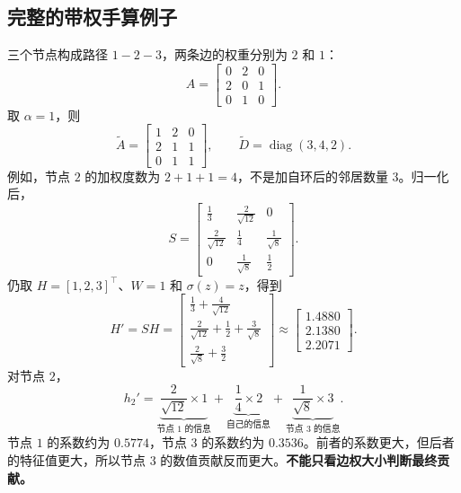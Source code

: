 \documentclass[UTF8,a4paper,11pt,fontset=fandol]{ctexart}
\begin{document}
\subsection{完整的带权手算例子}
三个节点构成路径 $1-2-3$，两条边的权重分别为 $2$ 和 $1$：
\begin{equation}
A=\begin{bmatrix}0&2&0\\2&0&1\\0&1&0\end{bmatrix}.
\end{equation}
取 $\alpha=1$，则
\begin{equation}
\widetilde A=\begin{bmatrix}1&2&0\\2&1&1\\0&1&1\end{bmatrix},
\qquad \widetilde D=\operatorname{diag}(3,4,2).
\end{equation}
例如，节点 $2$ 的加权度数为 $2+1+1=4$，不是加自环后的邻居数量 $3$。归一化后，
\begin{equation}
S=\begin{bmatrix}
\frac13&\frac2{\sqrt{12}}&0\\[2pt]
\frac2{\sqrt{12}}&\frac14&\frac1{\sqrt8}\\[2pt]
0&\frac1{\sqrt8}&\frac12
\end{bmatrix}.
\end{equation}
仍取 $H=[1,2,3]^\top$、$W=1$ 和 $\sigma(z)=z$，得到
\begin{equation}
H'=SH=
\begin{bmatrix}
\frac13+\frac4{\sqrt{12}}\\[3pt]
\frac2{\sqrt{12}}+\frac12+\frac3{\sqrt8}\\[3pt]
\frac2{\sqrt8}+\frac32
\end{bmatrix}
\approx\begin{bmatrix}1.4880\\2.1380\\2.2071\end{bmatrix}.
\end{equation}
对节点 $2$，
\begin{equation}
h_2'=
\underbrace{\frac2{\sqrt{12}}\times1}_{\text{节点 1 的信息}}
+\underbrace{\frac14\times2}_{\text{自己的信息}}
+\underbrace{\frac1{\sqrt8}\times3}_{\text{节点 3 的信息}}.
\end{equation}
节点 $1$ 的系数约为 $0.5774$，节点 $3$ 的系数约为 $0.3536$。前者的系数更大，但后者的特征值更大，所以节点 $3$ 的数值贡献反而更大。\textbf{不能只看边权大小判断最终贡献。}
\end{document}
